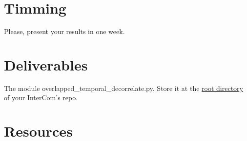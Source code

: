 \section{Timming}

Please, present your results in one week.

\section{Deliverables}

The module overlapped\_temporal\_decorrelate.py. Store it at the
\href{https://github.com/Tecnologias-multimedia/intercom}{root
  directory} of your InterCom's repo.

\section{Resources}


